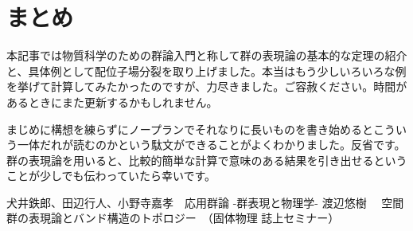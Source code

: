 \documentclass[uplatex,dvipdfmx,a4j]{jsarticle}
\begin{document}
\section{まとめ}
本記事では物質科学のための群論入門と称して群の表現論の基本的な定理の紹介と、具体例として配位子場分裂を取り上げました。本当はもう少しいろいろな例を挙げて計算してみたかったのですが、力尽きました。ご容赦ください。時間があるときにまた更新するかもしれません。

まじめに構想を練らずにノープランでそれなりに長いものを書き始めるとこういう一体だれが読むのかという駄文ができることがよくわかりました。反省です。群の表現論を用いると、比較的簡単な計算で意味のある結果を引き出せるということが少しでも伝わっていたら幸いです。

\begin{thebibliography}{9}
	 犬井鉄郎、田辺行人、小野寺嘉孝　応用群論 -群表現と物理学-
	 渡辺悠樹 　空間群の表現論とバンド構造のトポロジー　（固体物理 誌上セミナー）　
\end{thebibliography}
\end{document}
